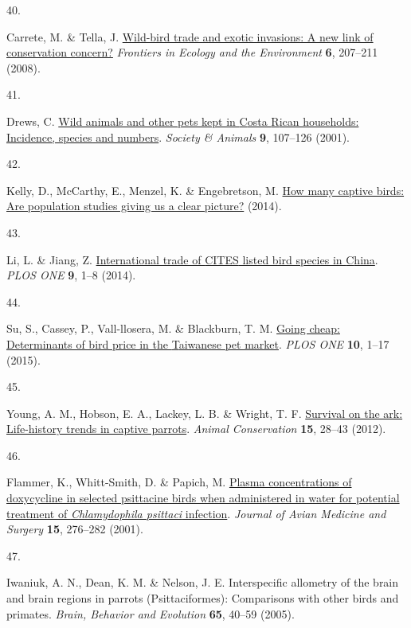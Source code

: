 \documentclass[
  man,floatsintext]{apa6}
\newlength{\cslhangindent}
\newlength{\csllabelwidth}
\newlength{\cslentryspacingunit} %
\newenvironment{CSLReferences}[2] %
 {%
  \setlength{\parindent}{0pt}
  \ifodd #1
  \let\oldpar\par
  \def\par{\hangindent=\cslhangindent\oldpar}
  \fi
  \setlength{\parskip}{#2\cslentryspacingunit}
 }%
 {}
\newcommand{\CSLLeftMargin}[1]{\parbox[t]{\csllabelwidth}{#1}}
\newcommand{\CSLRightInline}[1]{\parbox[t]{\linewidth - \csllabelwidth}{#1}\break}
\begin{document}
\begin{CSLReferences}{0}{0}
\leavevmode{}%
\CSLLeftMargin{40. }%
\CSLRightInline{Carrete, M. \& Tella, J. \href{https://doi.org/10.1890/070075}{Wild-bird trade and exotic invasions: A new link of conservation concern?} \emph{Frontiers in Ecology and the Environment} \textbf{6}, 207--211 (2008).}

\leavevmode{}%
\CSLLeftMargin{41. }%
\CSLRightInline{Drews, C. \href{https://doi.org/10.1163/156853001753639233}{Wild animals and other pets kept in {C}osta {R}ican households: Incidence, species and numbers}. \emph{Society \& Animals} \textbf{9}, 107--126 (2001).}

\leavevmode{}%
\CSLLeftMargin{42. }%
\CSLRightInline{Kelly, D., McCarthy, E., Menzel, K. \& Engebretson, M. \href{https://www.avianwelfare.org/issues/overview.htm}{How many captive birds: Are population studies giving us a clear picture?} (2014).}

\leavevmode{}%
\CSLLeftMargin{43. }%
\CSLRightInline{Li, L. \& Jiang, Z. \href{https://doi.org/10.1371/journal.pone.0085012}{International trade of {CITES} listed bird species in {C}hina}. \emph{PLOS ONE} \textbf{9}, 1--8 (2014).}

\leavevmode{}%
\CSLLeftMargin{44. }%
\CSLRightInline{Su, S., Cassey, P., Vall-llosera, M. \& Blackburn, T. M. \href{https://doi.org/10.1371/journal.pone.0127482}{Going cheap: Determinants of bird price in the {T}aiwanese pet market}. \emph{PLOS ONE} \textbf{10}, 1--17 (2015).}

\leavevmode{}%
\CSLLeftMargin{45. }%
\CSLRightInline{Young, A. M., Hobson, E. A., Lackey, L. B. \& Wright, T. F. \href{https://doi.org/10.1111/j.1469-1795.2011.00477.x}{Survival on the ark: Life-history trends in captive parrots}. \emph{Animal Conservation} \textbf{15}, 28--43 (2012).}

\leavevmode{}%
\CSLLeftMargin{46. }%
\CSLRightInline{Flammer, K., Whitt-Smith, D. \& Papich, M. \href{https://doi.org/10.1647/1082-6742(2001)015\%5B0276:PCODIS\%5D2.0.CO;2}{Plasma concentrations of doxycycline in selected psittacine birds when administered in water for potential treatment of \emph{{C}hlamydophila psittaci} infection}. \emph{Journal of Avian Medicine and Surgery} \textbf{15}, 276--282 (2001).}

\leavevmode{}%
\CSLLeftMargin{47. }%
\CSLRightInline{Iwaniuk, A. N., Dean, K. M. \& Nelson, J. E. Interspecific allometry of the brain and brain regions in parrots ({P}sittaciformes): Comparisons with other birds and primates. \emph{Brain, Behavior and Evolution} \textbf{65}, 40--59 (2005).}


\end{CSLReferences}
\end{document}
